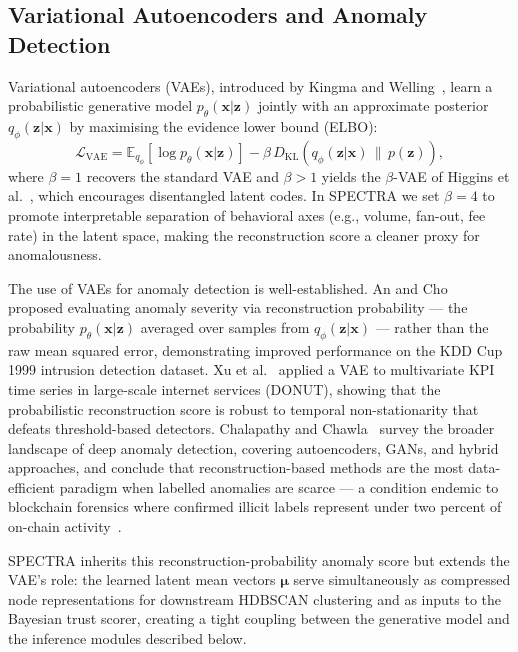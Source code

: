 \documentclass[journal]{IEEEtran}
\begin{document}
\subsection{Variational Autoencoders and Anomaly Detection}
\label{subsec:vae}

Variational autoencoders (VAEs), introduced by Kingma and Welling~\cite{Kingma2014},
learn a probabilistic generative model $p_\theta(\mathbf{x}|\mathbf{z})$ jointly
with an approximate posterior $q_\phi(\mathbf{z}|\mathbf{x})$ by maximising the
evidence lower bound (ELBO):
\begin{equation}
  \mathcal{L}_{\text{VAE}} =
      \mathbb{E}_{q_\phi}\!\left[\log p_\theta(\mathbf{x}|\mathbf{z})\right]
      - \beta\,D_{\mathrm{KL}}\!\left(q_\phi(\mathbf{z}|\mathbf{x}) \,\|\,
        p(\mathbf{z})\right),
  \label{eq:elbo}
\end{equation}
where $\beta=1$ recovers the standard VAE and $\beta > 1$ yields the
$\beta$-VAE of Higgins et al.~\cite{Higgins2017}, which encourages
disentangled latent codes.  In SPECTRA we set $\beta = 4$ to promote
interpretable separation of behavioral axes (e.g., volume, fan-out, fee rate)
in the latent space, making the reconstruction score a cleaner proxy for
anomalousness.

The use of VAEs for anomaly detection is well-established.  An and
Cho~\cite{AnCho2015} proposed evaluating anomaly severity via reconstruction
probability --- the probability $p_\theta(\mathbf{x}|\mathbf{z})$ averaged over
samples from $q_\phi(\mathbf{z}|\mathbf{x})$ --- rather than the raw mean squared
error, demonstrating improved performance on the KDD Cup 1999 intrusion
detection dataset.  Xu et al.~\cite{Xu2018} applied a VAE to multivariate KPI
time series in large-scale internet services (DONUT), showing that the
probabilistic reconstruction score is robust to temporal non-stationarity that
defeats threshold-based detectors.  Chalapathy and
Chawla~\cite{Chalapathy2019} survey the broader landscape of deep
anomaly detection, covering autoencoders, GANs, and hybrid
approaches, and conclude that reconstruction-based methods are the most
data-efficient paradigm when labelled anomalies are scarce --- a condition
endemic to blockchain forensics where confirmed illicit labels represent under
two percent of on-chain activity~\cite{Chainalysis2023}.

SPECTRA inherits this reconstruction-probability anomaly score but extends the
VAE's role: the learned latent mean vectors $\boldsymbol{\mu}$ serve
simultaneously as compressed node representations for downstream HDBSCAN
clustering and as inputs to the Bayesian trust scorer, creating a tight coupling
between the generative model and the inference modules described below.
\end{document}
